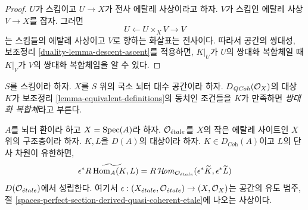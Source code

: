 \begin{proof}
$U$가 스킴이고 $U \to X$가 전사 에탈레 사상이라고 하자.
$V$가 스킴인 에탈레 사상 $V \to X$를 잡자.
그러면
$$
U \leftarrow U \times_X V \rightarrow V
$$
는 스킴들의 에탈레 사상이고 $V$로 향하는 화살표는 전사이다.
따라서 공간의 쌍대성, 보조정리
\ref{duality-lemma-descent-ascent}를 적용하면, $K|_U$가
$U$의 쌍대화 복합체일 때 $K|_V$가 $V$의 쌍대화 복합체임을 알 수 있다.
\end{proof}









\begin{definition}
\label{definition-dualizing-scheme}
$S$를 스킴이라 하자.
$X$를 $S$ 위의 국소 뇌터 대수 공간이라 하자.
$D_{\mathit{QCoh}}(\mathcal{O}_X)$의 대상 $K$가
보조정리 \ref{lemma-equivalent-definitions}의 동치인 조건들을
$K$가 만족하면 {\it 쌍대화 복합체}라고 부른다.
\end{definition}

\begin{lemma}
\label{lemma-affine-duality}
$A$를 뇌터 환이라 하고 $X = \mathop{\mathrm{Spec}}(A)$라 하자. $\mathcal{O}_{\acute{e}tale}$를
$X$의 작은 에탈레 사이트인 $X$ 위의 구조층이라 하자. $K, L$을 $D(A)$의
대상이라 하자. $K \in D_{\textit{Coh}}(A)$이고 $L$의 단사 차원이
유한하면,
$$
\epsilon^*\widetilde{R\mathop{\mathrm{Hom}}\nolimits_A(K, L)} =
R\mathop{\mathcal{H}\!\mathit{om}}\nolimits_{\mathcal{O}_{\acute{e}tale}}(\epsilon^*\widetilde{K},
\epsilon^*\widetilde{L})
$$
$D(\mathcal{O}_{\acute{e}tale})$에서 성립한다. 여기서
$\epsilon : (X_{\acute{e}tale}, \mathcal{O}_{\acute{e}tale}) \to (X, \mathcal{O}_X)$는
공간의 유도 범주, 절
\ref{spaces-perfect-section-derived-quasi-coherent-etale}에 나오는 사상이다.
\end{lemma}

